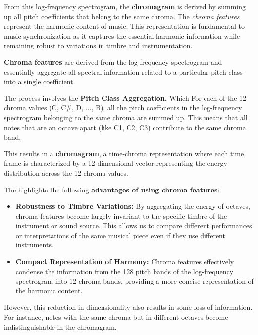 \documentclass[a4paper, 9pt, twocolumn]{extarticle}
\begin{document}
    From this log-frequency spectrogram, the \textbf{chromagram} is derived
    by summing up all pitch coefficients that belong to the same chroma. The
    \emph{chroma features} represent the harmonic content of music. This
    representation is fundamental to music synchronization as it captures
    the essential harmonic information while remaining robust to variations
    in timbre and instrumentation.
    
    \textbf{Chroma features} are derived from the log-frequency spectrogram
    and essentially aggregate all spectral information related to a
    particular pitch class into a single coefficient.
    
    The process involves the \textbf{Pitch Class Aggregation,} Which For
    each of the 12 chroma values (C, C\#, D, ..., B), all the pitch
    coefficients in the log-frequency spectrogram belonging to the same
    chroma are summed up. This means that all notes that are an octave apart
    (like C1, C2, C3) contribute to the same chroma band.
    
    This results in a \textbf{chromagram}, a time-chroma representation
    where each time frame is characterized by a 12-dimensional vector
    representing the energy distribution across the 12 chroma values.
    
    The highlights the following \textbf{advantages of using chroma
    features}:
    
    \begin{itemize}
    \item
      \textbf{Robustness to Timbre Variations:} By aggregating the energy of
      octaves, chroma features become largely invariant to the specific
      timbre of the instrument or sound source. This allows us to compare
      different performances or interpretations of the same musical piece
      even if they use different instruments.
    \item
      \textbf{Compact Representation of Harmony:} Chroma features
      effectively condense the information from the 128 pitch bands of the
      log-frequency spectrogram into 12 chroma bands, providing a more
      concise representation of the harmonic content.
    \end{itemize}
    
    However, this reduction in dimensionality also results in some loss of
    information. For instance, notes with the same chroma but in different
    octaves become indistinguishable in the chromagram.
    
\end{document}
